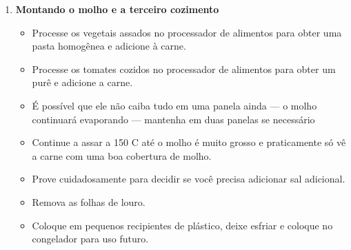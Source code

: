 \documentclass[11pt,letterpaper]{article}
\begin{document}
\begin {description}
\begin {enumerate}
\item {\bf Montando o molho e a terceiro cozimento}
\begin {itemize}
\item Processe os vegetais assados no processador de alimentos para obter uma pasta homog\^enea e adicione à carne.
\item Processe os tomates cozidos no processador de alimentos para obter um purê e adicione a carne.
\item É possível que ele não caiba tudo em uma panela ainda --- o molho continuará evaporando --- mantenha em duas panelas se necessário
\item Continue a assar a 150 C até o molho é muito grosso e praticamente só vê a carne com uma boa cobertura de molho.
\item Prove cuidadosamente para decidir se você precisa adicionar sal adicional.
\item Remova as folhas de louro.
\item Coloque em pequenos recipientes de pl\'astico, deixe esfriar e coloque no congelador para uso futuro.
\end {itemize}
     \end {enumerate}
\end {description}
\end{document}
